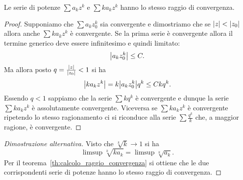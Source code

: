 \begin{theorem}
\label{th:raggio_serie_derivate}
Le serie di potenze $\sum a_k z^k$ e $\sum k a_k z^k$ hanno
lo stesso raggio di convergenza.
\end{theorem}
%
\begin{proof}
  Supponiamo che $\sum a_k z_0^k$ sia convergente e
  dimostriamo che se ${\left|z\right|}<{\left|z_0\right|}$ allora anche
  $\sum k a_k z^k$ è convergente.
  Se la prima serie è convergente allora il termine generico
   deve essere infinitesimo e quindi limitato:
   \[
     {\left|a_k z_0^k\right|} \le C.
   \]
  Ma allora posto $q=\frac{{\left|z\right|}}{{\left|z_0\right|}} < 1$ si ha
  \[
  {\left| k a_k z^k\right|} = k {\left|a_k z_0^k\right|} q^k \le C k q^k.
  \]
  Essendo $q<1$ sappiamo che la serie $\sum k q^k$ è convergente
  e dunque la serie $\sum k a_k z^k$ è assolutamente convergente.
  Viceversa se $\sum k a_k z^k$ è convergente ripetendo lo stesso
  ragionamento ci si riconduce alla serie $\sum \frac{q^k}{k}$ che,
  a maggior ragione, è convergente.
\end{proof}
%
\begin{proof}[Dimostrazione alternativa]
Visto che $\sqrt[k]{k}\to 1$ si ha
\[
  \limsup \sqrt[k]{k a_k} = \limsup \sqrt[k]{a_k}.
\]
Per il teorema~\ref{th:calcolo_raggio_convergenza} si ottiene
che le due corrispondenti serie di potenze hanno lo stesso raggio di convergenza.
\end{proof}

